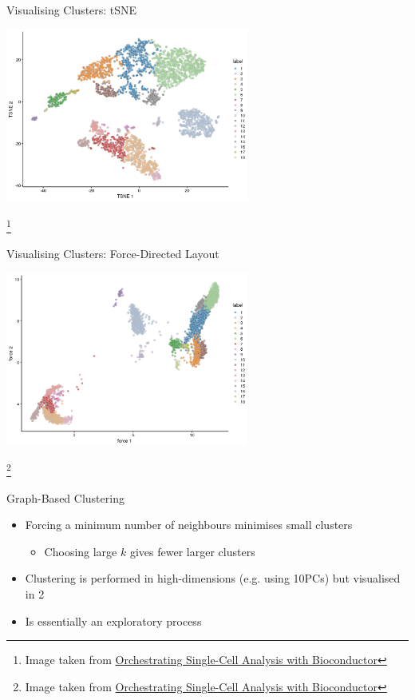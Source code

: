\documentclass[aspectratio=169,11pt]{beamer}
\newcommand\blfootnote[1]{%
  \begingroup
  \renewcommand\thefootnote{}\footnote{#1}%
  \addtocounter{footnote}{-1}%
  \endgroup
}
\begin{document}
\begin{frame}{Visualising Clusters: tSNE}

	\begin{center}
	\includegraphics[width=0.6\textwidth]{figures/tsne-clust-graph-1.png} 
	\end{center}
	
	\blfootnote{Image taken from \href{https://osca.bioconductor.org/}{Orchestrating Single-Cell Analysis with Bioconductor}}
	
\end{frame}

\begin{frame}{Visualising Clusters: Force-Directed Layout}

	\begin{center}
	\includegraphics[width=0.6\textwidth]{figures/pbmc-force-1.png} 
	\end{center}
	
	\blfootnote{Image taken from \href{https://osca.bioconductor.org/}{Orchestrating Single-Cell Analysis with Bioconductor}}
	
\end{frame}

\begin{frame}{Graph-Based Clustering}

	\begin{itemize}
		\item Forcing a minimum number of neighbours minimises small clusters
		\begin{itemize}
			\item Choosing large $k$ gives fewer larger clusters
		\end{itemize}
		\item Clustering is performed in high-dimensions (e.g. using 10PCs) but visualised in 2
		\item Is essentially an exploratory process
	\end{itemize}
	
\end{frame}
\end{document}
